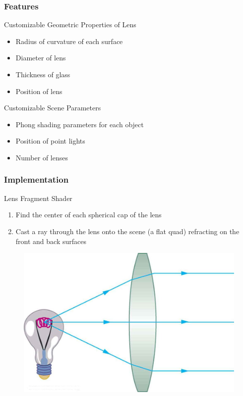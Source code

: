 \documentclass{beamer}
\begin{document}
\begin{frame}
    \frametitle{Features}
    \begin{block}{Customizable Geometric Properties of Lens}
        \begin{itemize}
        \item Radius of curvature of each surface
        \item Diameter of lens
        \item Thickness of glass
        \item Position of lens
        \end{itemize}
    \end{block}
    \begin{block}{Customizable Scene Parameters}
        \begin{itemize}
            \item Phong shading parameters for each object
            \item Position of point lights
            \item Number of lenses
        \end{itemize}
    \end{block}
\end{frame} 

\begin{frame}
    \frametitle{Implementation}
    \begin{block}{Lens Fragment Shader}
        \begin{enumerate} 
            \item Find the center of each spherical cap of the lens
            \item Cast a ray through the lens onto the scene (a flat quad) refracting on the front and back surfaces
        \end{enumerate}
        \begin{figure}
            \includegraphics[height=0.4\textheight]{images/lens}
        \end{figure}
    \end{block}
\end{frame} 
\end{document}
